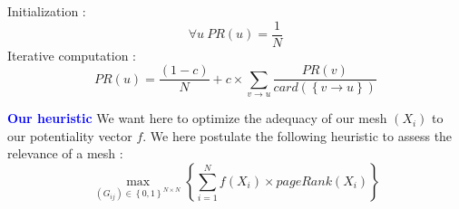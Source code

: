 \documentclass[a4, 14pts]{seminar}
\begin{document}
{{\begin{slide}
	    \newline
	    Initialization :
	    \begin{equation}
	    \forall u \ PR\left(u\right)=\frac{1}{N}
	    \end{equation} 
	    Iterative computation :
	    \begin{equation}
	    PR\left(u\right)= \frac{\left(1-c\right)}{N} + c \times \sum_{v \rightarrow u}\frac{PR\left(v\right)}{card\left(\left\{v\rightarrow u\right\}\right)}
	    \end{equation}
	    \end{slide}
	    \begin{slide}
	    \textbf{\textcolor{blue}{\large Our heuristic}}\newline 
	    We want here to optimize the adequacy of our mesh $\left(X_i\right)$ to our potentiality vector $f$.
	    We here postulate the following heuristic to assess the relevance of a mesh :
	    \begin{equation}
	    \max_{\left(G_{ij}\right)  \in \left\{0,1\right\}^{N\times N}}\left\{ \sum^{N}_{i=1} f\left(X_i\right)\times pageRank(X_i)\right\}
	    \end{equation} 
	    \end{slide}

}}
\end{document}
